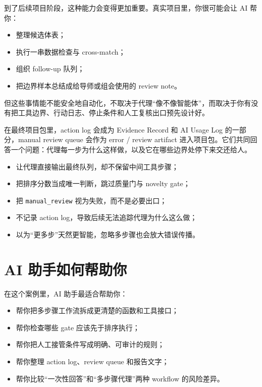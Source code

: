 到了后续项目阶段，这种能力会变得更加重要。真实项目里，你很可能会让 AI 帮你：

\begin{itemize}
    \item 整理候选体表；
    \item 执行一串数据检查与 cross-match；
    \item 组织 follow-up 队列；
    \item 把边界样本总结成给导师或组会使用的 review note。
\end{itemize}

但这些事情能不能安全地自动化，不取决于代理“像不像智能体”，而取决于你有没有把工具边界、行动日志、停止条件和人工复核出口预先设计好。

在最终项目包里，action log 会成为 Evidence Record 和 AI Usage Log 的一部分，manual review queue 会作为 error / review artifact 进入项目包。它们共同回答一个问题：代理每一步为什么这样做，以及它在哪些边界处停下来交还给人。

\begin{warnbox}
\begin{itemize}
    \item 让代理直接输出最终队列，却不保留中间工具步骤；
    \item 把排序分数当成唯一判断，跳过质量门与 novelty gate；
    \item 把 \texttt{manual\_review} 视为失败，而不是必要出口；
    \item 不记录 action log，导致后续无法追踪代理为什么这么做；
    \item 以为“更多步”天然更智能，忽略多步骤也会放大错误传播。
\end{itemize}
\end{warnbox}

\section{AI 助手如何帮助你}

在这个案例里，AI 助手最适合帮助你：

\begin{itemize}
    \item 帮你把多步骤工作流拆成更清楚的函数和工具接口；
    \item 帮你检查哪些 gate 应该先于排序执行；
    \item 帮你把人工接管条件写成明确、可审计的规则；
    \item 帮你整理 action log、review queue 和报告文字；
    \item 帮你比较“一次性回答”和“多步骤代理”两种 workflow 的风险差异。
\end{itemize}

